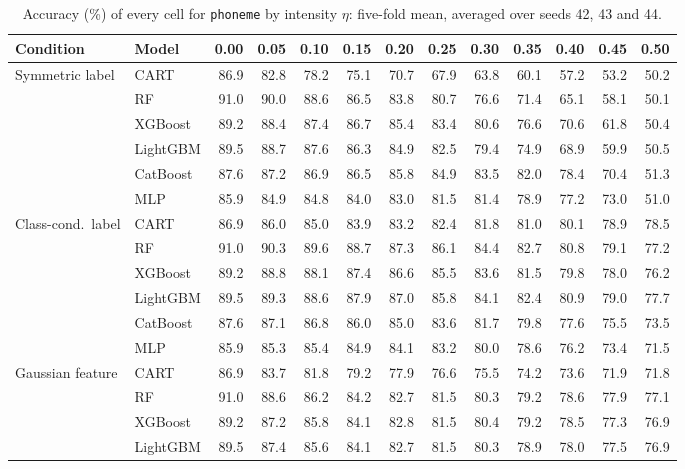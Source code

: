 \begin{table}[p]
\centering
\tiny
\setlength{\tabcolsep}{2.6pt}
\caption{Accuracy (\%) of every cell for \texttt{phoneme} by intensity $\eta$: five-fold mean, averaged over seeds 42, 43 and 44.}
\label{tab:grid_phoneme}
\begin{tabular}{@{}llrrrrrrrrrrr@{}}
\toprule
Condition & Model & 0.00 & 0.05 & 0.10 & 0.15 & 0.20 & 0.25 & 0.30 & 0.35 & 0.40 & 0.45 & 0.50 \\
\midrule
Symmetric label & CART & 86.9 & 82.8 & 78.2 & 75.1 & 70.7 & 67.9 & 63.8 & 60.1 & 57.2 & 53.2 & 50.2 \\
 & RF & 91.0 & 90.0 & 88.6 & 86.5 & 83.8 & 80.7 & 76.6 & 71.4 & 65.1 & 58.1 & 50.1 \\
 & XGBoost & 89.2 & 88.4 & 87.4 & 86.7 & 85.4 & 83.4 & 80.6 & 76.6 & 70.6 & 61.8 & 50.4 \\
 & LightGBM & 89.5 & 88.7 & 87.6 & 86.3 & 84.9 & 82.5 & 79.4 & 74.9 & 68.9 & 59.9 & 50.5 \\
 & CatBoost & 87.6 & 87.2 & 86.9 & 86.5 & 85.8 & 84.9 & 83.5 & 82.0 & 78.4 & 70.4 & 51.3 \\
 & MLP & 85.9 & 84.9 & 84.8 & 84.0 & 83.0 & 81.5 & 81.4 & 78.9 & 77.2 & 73.0 & 51.0 \\
\midrule
Class-cond.\ label & CART & 86.9 & 86.0 & 85.0 & 83.9 & 83.2 & 82.4 & 81.8 & 81.0 & 80.1 & 78.9 & 78.5 \\
 & RF & 91.0 & 90.3 & 89.6 & 88.7 & 87.3 & 86.1 & 84.4 & 82.7 & 80.8 & 79.1 & 77.2 \\
 & XGBoost & 89.2 & 88.8 & 88.1 & 87.4 & 86.6 & 85.5 & 83.6 & 81.5 & 79.8 & 78.0 & 76.2 \\
 & LightGBM & 89.5 & 89.3 & 88.6 & 87.9 & 87.0 & 85.8 & 84.1 & 82.4 & 80.9 & 79.0 & 77.7 \\
 & CatBoost & 87.6 & 87.1 & 86.8 & 86.0 & 85.0 & 83.6 & 81.7 & 79.8 & 77.6 & 75.5 & 73.5 \\
 & MLP & 85.9 & 85.3 & 85.4 & 84.9 & 84.1 & 83.2 & 80.0 & 78.6 & 76.2 & 73.4 & 71.5 \\
\midrule
Gaussian feature & CART & 86.9 & 83.7 & 81.8 & 79.2 & 77.9 & 76.6 & 75.5 & 74.2 & 73.6 & 71.9 & 71.8 \\
 & RF & 91.0 & 88.6 & 86.2 & 84.2 & 82.7 & 81.5 & 80.3 & 79.2 & 78.6 & 77.9 & 77.1 \\
 & XGBoost & 89.2 & 87.2 & 85.8 & 84.1 & 82.8 & 81.5 & 80.4 & 79.2 & 78.5 & 77.3 & 76.9 \\
 & LightGBM & 89.5 & 87.4 & 85.6 & 84.1 & 82.7 & 81.5 & 80.3 & 78.9 & 78.0 & 77.5 & 76.9 \\

\end{tabular}
\end{table}
